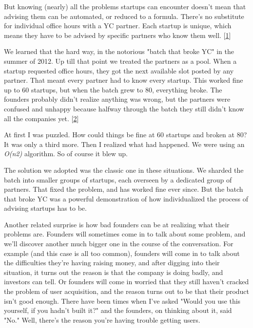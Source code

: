 But
                  knowing (nearly) all the problems startups can encounter
                  doesn't mean that advising them can be automated, or reduced
                  to a formula. There's no substitute for individual office
                  hours with a YC partner. Each startup is unique, which means
                  they have to be advised by specific partners who know them
                  well.
                  [\href{\#f1n}{1}]

We learned that the hard way, in the notorious
                  "batch that broke YC" in the summer of 2012. Up till that
                  point we treated the partners as a pool. When a startup
                  requested office hours, they got the next available slot
                  posted by any partner. That meant every partner had to know
                  every startup. This worked fine up to 60 startups, but when
                  the batch grew to 80, everything broke. The founders probably
                  didn't realize anything was wrong, but the partners were
                  confused and unhappy because halfway through the batch they
                  still didn't know all the companies yet.
                  [\href{\#f2n}{2}]

At first I was puzzled. How could things be fine
                  at 60 startups and broken at 80? It was only a third more.
                  Then I realized what had happened. We were using an
                  \emph{O(n2)}
                  algorithm. So of course it blew up.

The solution we
                  adopted was the classic one in these situations. We sharded
                  the batch into smaller groups of startups, each overseen by a
                  dedicated group of partners. That fixed the problem, and has
                  worked fine ever since. But the batch that broke YC was a
                  powerful demonstration of how individualized the process of
                  advising startups has to be.

Another related
                  surprise is how bad founders can be at realizing what their
                  problems are. Founders will sometimes come in to talk about
                  some problem, and we'll discover another much bigger one in
                  the course of the conversation. For example (and this case is
                  all too common), founders will come in to talk about the
                  difficulties they're having raising money, and after digging
                  into their situation, it turns out the reason is that the
                  company is doing badly, and investors can tell. Or founders
                  will come in worried that they still haven't cracked the
                  problem of user acquisition, and the reason turns out to be
                  that their product isn't good enough. There have been times
                  when I've asked "Would you use this yourself, if you hadn't
                  built it?" and the founders, on thinking about it, said "No."
                  Well, there's the reason you're having trouble getting
                  users.

